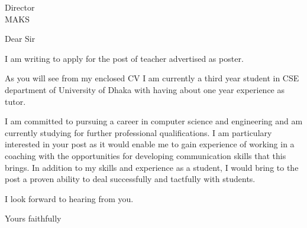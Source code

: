 \documentclass{letter}
\begin{document}
\begin{letter}{Director\\MAKS}
  \opening{Dear Sir}

  I am writing to apply for the post of teacher advertised as poster.

  As you will see from my enclosed CV I am currently a third year student in CSE department of University of Dhaka with having about one year experience as tutor.

  I am committed to pursuing a career in computer science and engineering and am currently studying for further professional qualifications. I am particulary interested in your post as it would enable me to gain experience of working in a coaching with the opportunities for developing communication skills that this brings. In addition to my skills and experience as a student, I would bring to the post a proven ability to deal successfully and tactfully with students.

  I look forward to hearing from you.
  \closing{Yours faithfully}
\end{letter}
\end{document}
